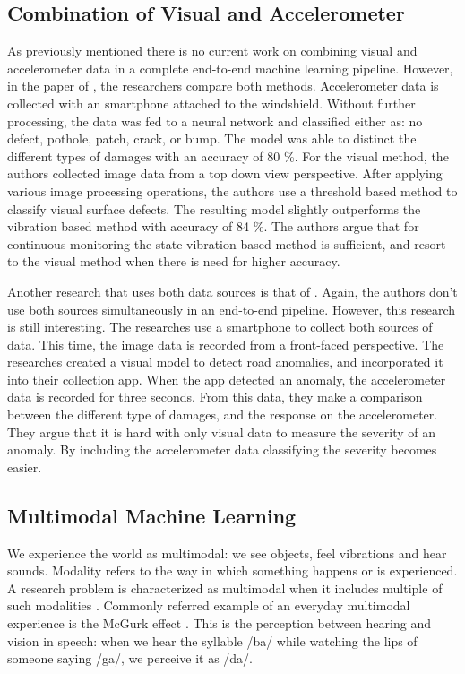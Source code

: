 \subsection{Combination of Visual and Accelerometer}
As previously mentioned there is no current work on combining visual and accelerometer data in a complete end-to-end machine learning pipeline. However, in the paper of , the researchers compare both methods. Accelerometer data is collected with an smartphone attached to the windshield. Without further processing, the data was fed to a neural network and classified either as: no defect, pothole, patch, crack, or bump. The model was able to distinct the different types of damages with an accuracy of 80 \%. For the visual method, the authors collected image data from a top down view perspective. After applying various image processing operations, the authors use a threshold based method to classify visual surface defects. The resulting model slightly outperforms the vibration based method with accuracy of 84 \%. The authors argue that for continuous monitoring the state vibration based method is sufficient, and resort to the visual method when there is need for higher accuracy.

Another research that uses both data sources is that of . Again, the authors don't use both sources simultaneously in an end-to-end pipeline. However, this research is still interesting. The researches use a smartphone to collect both sources of data. This time, the image data is recorded from a front-faced perspective. The researches created a visual model to detect road anomalies, and incorporated it into their collection app. When the app detected an anomaly, the accelerometer data is recorded for three seconds. From this data, they make a comparison between the different type of damages, and the response on the accelerometer. They argue that it is hard with only visual data to measure the severity of an anomaly. By including the accelerometer data classifying the severity becomes easier.



\subsection{Multimodal Machine Learning}
\label{section:multimodal-ml}

We experience the world as multimodal: we see objects, feel vibrations and hear sounds. Modality refers to the way in which something happens or is experienced. A research problem is characterized as multimodal when it includes multiple of such modalities \cite{Baltrusaitis2017}. Commonly referred example of an everyday multimodal experience is the McGurk effect \cite{McGurk1976}. This is the perception between hearing and vision in speech: when we hear the syllable /ba/ while watching the lips of someone saying /ga/, we perceive it as /da/. 

